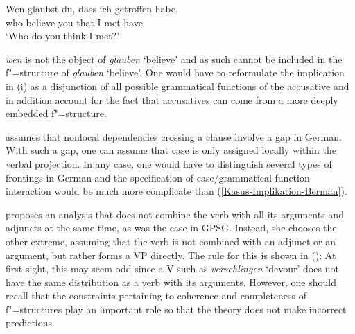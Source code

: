 {{\ea
\gll Wen glaubst du, dass ich getroffen habe.\\
	 who believe you that I met have\\
\glt `Who do you think I met?'
\z

\noindent
\emph{wen} is not the object of \emph{glauben} `believe' and as such cannot be included in the
f"=structure of \emph{glauben} `believe'. One would have to reformulate the implication in
(i) as a disjunction of all possible grammatical functions of the accusative and in addition account
for the fact that accusatives can come from a more deeply embedded f"=structure.

\citet[]{Bresnan2001a} assumes that nonlocal dependencies crossing a clause involve a gap
in German. With such a gap, one can assume that case is only assigned locally within the verbal
projection. In any case, one would have to distinguish several types of frontings in German and the
specification of case/grammatical function interaction would be much more complicate than (\ref{Kasus-Implikation-Berman}).%
%
}
\ea
\label{le-verschlingen}
\z

\largerpage
\noindent
\citeauthor{Berman96a-u} proposes an analysis that does not combine the verb with all its arguments and adjuncts at
the same time, as was the case in GPSG\indexgpsg. Instead, she chooses the other extreme, assuming
that the verb is not combined with an adjunct or an argument, but rather forms a VP directly. The rule for this is shown in ():
\ea
\label{LFG-v-vp}
\z
At first sight, this may seem odd since a V such as \emph{verschlingen} `devour' does not have the same distribution as a verb with its arguments. However, one should recall that the
constraints pertaining to coherence and completeness of f"=structures play an important role so that
the theory does not make incorrect predictions.
}%

